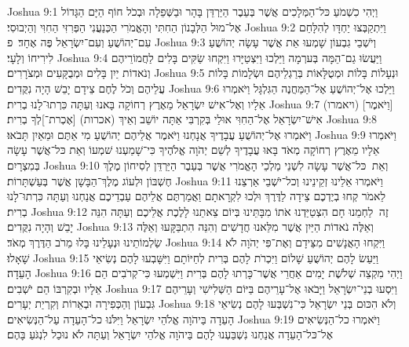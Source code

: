 Joshua 9:1	וַיְהִי כִשְׁמֹעַ כּל־הַמְּלָכִים אֲשֶׁר בְּעֵבֶר הַיַּרְדֵּן בָּהָר וּבַשְּׁפֵלָה וּבְכֹל חוֹף הַיָּם הַגָּדוֹל אֶל־מוּל הַלְּבָנוֹן הַחִתִּי וְהָאֱמֹרִי הַכְּנַעֲנִי הַפְּרִזִּי הַחִוִּי וְהַיְבוּסִי׃
Joshua 9:2	וַיִּתְקַבְּצוּ יַחְדָּו לְהִלָּחֵם עִם־יְהוֹשֻׁעַ וְעִם־יִשְׂרָאֵל פֶּה אֶחָד׃ {פ}
Joshua 9:3	וְיֹשְׁבֵי גִבְעוֹן שָׁמְעוּ אֵת אֲשֶׁר עָשָׂה יְהוֹשֻׁעַ לִירִיחוֹ וְלָעָי׃
Joshua 9:4	וַיַּעֲשׂוּ גַם־הֵמָּה בְּערְמָה וַיֵּלְכוּ וַיִּצְטַיָּרוּ וַיִּקְחוּ שַׂקִּים בָּלִים לַחֲמוֹרֵיהֶם וְנֹאדוֹת יַיִן בָּלִים וּמְבֻקָּעִים וּמְצֹרָרִים׃
Joshua 9:5	וּנְעָלוֹת בָּלוֹת וּמְטֻלָּאוֹת בְּרַגְלֵיהֶם וּשְׂלָמוֹת בָּלוֹת עֲלֵיהֶם וְכֹל לֶחֶם צֵידָם יָבֵשׁ הָיָה נִקֻּדִים׃
Joshua 9:6	וַיֵּלְכוּ אֶל־יְהוֹשֻׁעַ אֶל־הַמַּחֲנֶה הַגִּלְגָּל וַיֹּאמְרוּ אֵלָיו וְאֶל־אִישׁ יִשְׂרָאֵל מֵאֶרֶץ רְחוֹקָה בָּאנוּ וְעַתָּה כִּרְתוּ־לָנוּ בְרִית׃
Joshua 9:7	(ויאמרו) [וַיֹּאמֶר] אִישׁ־יִשְׂרָאֵל אֶל־הַחִוִּי אוּלַי בְּקִרְבִּי אַתָּה יוֹשֵׁב וְאֵיךְ (אכרות) [אֶכְרת־]לְךָ בְרִית׃
Joshua 9:8	וַיֹּאמְרוּ אֶל־יְהוֹשֻׁעַ עֲבָדֶיךָ אֲנָחְנוּ וַיֹּאמֶר אֲלֵיהֶם יְהוֹשֻׁעַ מִי אַתֶּם וּמֵאַיִן תָּבֹאוּ׃
Joshua 9:9	וַיֹּאמְרוּ אֵלָיו מֵאֶרֶץ רְחוֹקָה מְאֹד בָּאוּ עֲבָדֶיךָ לְשֵׁם יְהֹוָה אֱלֹהֶיךָ כִּי־שָׁמַעְנוּ שׁמְעוֹ וְאֵת כּל־אֲשֶׁר עָשָׂה בְּמִצְרָיִם׃
Joshua 9:10	וְאֵת  כּל־אֲשֶׁר עָשָׂה לִשְׁנֵי מַלְכֵי הָאֱמֹרִי אֲשֶׁר בְּעֵבֶר הַיַּרְדֵּן לְסִיחוֹן מֶלֶךְ חֶשְׁבּוֹן וּלְעוֹג מֶלֶךְ־הַבָּשָׁן אֲשֶׁר בְּעַשְׁתָּרוֹת׃
Joshua 9:11	וַיֹּאמְרוּ אֵלֵינוּ זְקֵינֵינוּ וְכל־יֹשְׁבֵי אַרְצֵנוּ לֵאמֹר קְחוּ בְיֶדְכֶם צֵידָה לַדֶּרֶךְ וּלְכוּ לִקְרָאתָם וַאֲמַרְתֶּם אֲלֵיהֶם עַבְדֵיכֶם אֲנַחְנוּ וְעַתָּה כִּרְתוּ־לָנוּ בְרִית׃
Joshua 9:12	זֶה  לַחְמֵנוּ חָם הִצְטַיַּדְנוּ אֹתוֹ מִבָּתֵּינוּ בְּיוֹם צֵאתֵנוּ לָלֶכֶת אֲלֵיכֶם וְעַתָּה הִנֵּה יָבֵשׁ וְהָיָה נִקֻּדִים׃
Joshua 9:13	וְאֵלֶּה נֹאדוֹת הַיַּיִן אֲשֶׁר מִלֵּאנוּ חֲדָשִׁים וְהִנֵּה הִתְבַּקָּעוּ וְאֵלֶּה שַׂלְמוֹתֵינוּ וּנְעָלֵינוּ בָּלוּ מֵרֹב הַדֶּרֶךְ מְאֹד׃
Joshua 9:14	וַיִּקְחוּ הָאֲנָשִׁים מִצֵּידָם וְאֶת־פִּי יְהֹוָה לֹא שָׁאָלוּ׃
Joshua 9:15	וַיַּעַשׂ לָהֶם יְהוֹשֻׁעַ שָׁלוֹם וַיִּכְרֹת לָהֶם בְּרִית לְחַיּוֹתָם וַיִּשָּׁבְעוּ לָהֶם נְשִׂיאֵי הָעֵדָה׃
Joshua 9:16	וַיְהִי מִקְצֵה שְׁלֹשֶׁת יָמִים אַחֲרֵי אֲשֶׁר־כָּרְתוּ לָהֶם בְּרִית וַיִּשְׁמְעוּ כִּי־קְרֹבִים הֵם אֵלָיו וּבְקִרְבּוֹ הֵם יֹשְׁבִים׃
Joshua 9:17	וַיִּסְעוּ בְנֵי־יִשְׂרָאֵל וַיָּבֹאוּ אֶל־עָרֵיהֶם בַּיּוֹם הַשְּׁלִישִׁי וְעָרֵיהֶם גִּבְעוֹן וְהַכְּפִירָה וּבְאֵרוֹת וְקִרְיַת יְעָרִים׃
Joshua 9:18	וְלֹא הִכּוּם בְּנֵי יִשְׂרָאֵל כִּי־נִשְׁבְּעוּ לָהֶם נְשִׂיאֵי הָעֵדָה בַּיהֹוָה אֱלֹהֵי יִשְׂרָאֵל וַיִּלֹּנוּ כל־הָעֵדָה עַל־הַנְּשִׂיאִים׃
Joshua 9:19	וַיֹּאמְרוּ כל־הַנְּשִׂיאִים אֶל־כּל־הָעֵדָה אֲנַחְנוּ נִשְׁבַּעְנוּ לָהֶם בַּיהֹוָה אֱלֹהֵי יִשְׂרָאֵל וְעַתָּה לֹא נוּכַל לִנְגֹּעַ בָּהֶם׃
